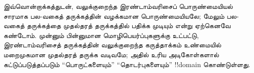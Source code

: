 \documentclass[../../../include/open-logic-section]{subfiles}
\begin{document}
இவ்வொன்றாக்கத்துடன், வலுக்குறைந்த இரண்டாம்வரிசைப் பொருண்மையியல் சாரமாக
பல-வகைத் தருக்கத்தின் வழக்கமான பொருண்மையியலே; மேலும் பல-வகைத் தருக்கத்தை
முதல்தரத் தருக்கத்தில் பதிக்க முடியும் என்று ஏற்கெனவே கண்டோம். முன்னும்
பின்னுமான மொழிபெயர்ப்புகளுக்கு உட்பட்டு, இரண்டாம்வரிசைத் தருக்கத்தின்
வலுக்குறைந்த கருத்தாக்கம் உண்மையில் மறைமுகமான முதல்தரத் தருக்க வடிவமே;
அதில் உரிய அடிகோள்களால் கட்டுப்படுத்தப்படும் ``பொருட்களையும்''
``தொடர்புகளையும்'' !!{domain} கொண்டுள்ளது.
\end{document}
